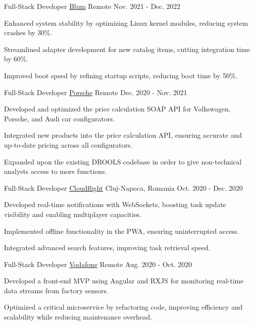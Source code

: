 \begin{cventries}
  \cventry
    {Full-Stack Developer} %
    {\href{https://blum.com}{Blum}} %
    {Remote} %
    {Nov. 2021 - Dec. 2022} %
    {
      \begin{cvitems} %
        \item {Enhanced system stability by optimizing Linux kernel modules, reducing system crashes by 30\%.}
        \item {Streamlined adapter development for new catalog items, cutting integration time by 60\%.}
        \item {Improved boot speed by refining startup scripts, reducing boot time by 50\%.}
      \end{cvitems}
    }

  \cventry
    {Full-Stack Developer} %
    {\href{https://www.porscheengineering.com}{Porsche}} %
    {Remote} %
    {Dec. 2020 - Nov. 2021} %
    {
      \begin{cvitems} %
        \item {Developed and optimized the price calculation SOAP API for Volkswagen, Porsche, and Audi car configurators.}
        \item {Integrated new products into the price calculation API, ensuring accurate and up-to-date pricing across all configurators.}
        \item {Expanded upon the existing DROOLS codebase in order to give non-technical analysts access to more functions.}
      \end{cvitems}
    }

  \cventry
    {Full-Stack Developer} %
    {\href{https://cloudflight.io}{Cloudflight}} %
    {Cluj-Napoca, Romania} %
    {Oct. 2020 - Dec. 2020} %
    {
      \begin{cvitems} %
        \item {Developed real-time notifications with WebSockets, boosting task update visibility and enabling multiplayer capacities.}
        \item {Implemented offline functionality in the PWA, ensuring uninterrupted access.}
        \item {Integrated advanced search features, improving task retrieval speed.}
      \end{cvitems}
    }

  \cventry
    {Full-Stack Developer} %
    {\href{https://vodafone.com}{Vodafone}} %
    {Remote} %
    {Aug. 2020 - Oct. 2020} %
    {
      \begin{cvitems} %
        \item {Developed a front-end MVP using Angular and RXJS for monitoring real-time data streams from factory sensors.}
        \item {Optimized a critical microservice by refactoring code, improving efficiency and scalability while reducing maintenance overhead.}
      \end{cvitems}
    }

\end{cventries}
